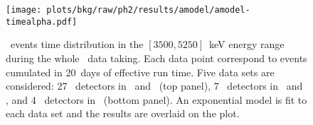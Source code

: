 \begin{figure}
  \centering
  \texttt{[image: plots/bkg/raw/ph2/results/amodel/amodel-timealpha.pdf]}
  \caption{%
    \a\ events time distribution in the $[3500,5250]$~keV energy range during the whole
    \phasetwo\ data taking. Each data point correspond to events cumulated in 20~days of
    effective run time. Five data sets are considered: 27 \bege\ detectors in \phasetwo\ and
    \phasetwop\ (top panel), 7 \scoax\ detectors in \phasetwo\ and \phasetwop, and 4
    \icoax\ detectors in \phasetwop\ (bottom panel). An exponential model is fit to each
    data set and the results are overlaid on the plot.
  }\label{fig:bkg:raw:timealpha:results}
\end{figure}

